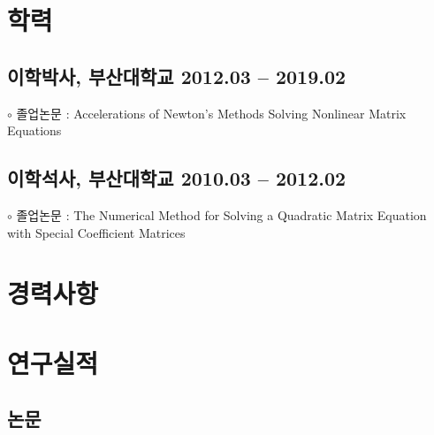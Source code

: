 \documentclass[11pt]{article} %
\newcommand\mycareer{}
\newcommand\myedu{
	\subsection*{이학박사, 부산대학교 \hfill 2012.03 -- 2019.02} %
	$\circ$ 졸업논문 : Accelerations of Newton's Methods Solving Nonlinear Matrix Equations
	
	\subsection*{이학석사, 부산대학교 \hfill 2010.03 -- 2012.02} %
	$\circ$ 졸업논문 : The Numerical Method for Solving a Quadratic Matrix Equation with Special Coefficient Matrices
}
\newcommand\mypapers{
	
}
\begin{document}

%

\section*{학력}

\myedu


%

\section*{경력사항}

\mycareer

\section*{연구실적}

\subsection*{논문}

\mypapers
\end{document}
